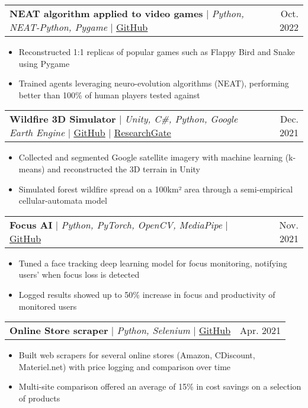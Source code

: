 \documentclass[letterpaper,11t]{article}
\makeatletter
\newcommand{\resumeItem}[1]{
  \item\small{
    {#1 \vspace{-2pt}}
  }
}
\newcommand{\resumeProjectHeading}[2]{
    \item
    \begin{tabular*}{0.97\textwidth}{l@{\extracolsep{\fill}}r}
      \small#1 & #2 \\
    \end{tabular*}\vspace{-7pt}
}
\newcommand{\resumeItemListStart}{\begin{itemize}}
\newcommand{\resumeItemListEnd}{\end{itemize}\vspace{-5pt}}
\makeatother
\begin{document}
          
        \resumeProjectHeading
        {\textbf{NEAT algorithm applied to video games} $|$ \emph{Python, NEAT-Python, Pygame} $|$ \href{https://github.com/Somnef/snake_neat_ai}{\underline{GitHub}}}{Oct. 2022}
            \resumeItemListStart
                \resumeItem{Reconstructed 1:1 replicas of popular games such as Flappy Bird and Snake using Pygame}
                \resumeItem{Trained agents leveraging neuro-evolution algorithms (NEAT), performing better than 100\% of human players tested against}
            \resumeItemListEnd

        \resumeProjectHeading
            {\textbf{Wildfire 3D Simulator} $|$ \emph{Unity, C\#, Python, Google Earth Engine} $|$ \href{https://github.com/Somnef/semi-empirical-wildfire-simulation}{\underline{GitHub}} $|$ \href{https://www.researchgate.net/publication/354678516_Applying_semi-empirical_simulation_of_wildfire_on_real_world_satellite_imagery_data}{\underline{ResearchGate}}}{Dec. 2021}
                \resumeItemListStart
                    \resumeItem{Collected and segmented Google satellite imagery with machine learning (k-means) and reconstructed the 3D terrain in Unity}
                    \resumeItem{Simulated forest wildfire spread on a 100km² area through a semi-empirical cellular-automata model}
                \resumeItemListEnd

        \resumeProjectHeading
          {\textbf{Focus AI} $|$ \emph{Python, PyTorch, OpenCV, MediaPipe} $|$ \href{https://github.com/Somnef/focus-monitor-ai}{\underline{GitHub}}}{Nov. 2021}
          \resumeItemListStart
            \resumeItem{Tuned a face tracking deep learning model for focus monitoring, notifying users' when focus loss is detected }
            \resumeItem{Logged results showed up to 50\% increase in focus and productivity of monitored users} 
          \resumeItemListEnd

        \resumeProjectHeading
        {\textbf{Online Store scraper} $|$ \emph{Python, Selenium} $|$ \href{https://github.com/Somnef/Cdiscountscraper}{\underline{GitHub}}}{Apr. 2021}
            \resumeItemListStart
                \resumeItem{Built web scrapers for several online stores (Amazon, CDiscount, Materiel.net) with price logging and comparison over time}
                \resumeItem{Multi-site comparison offered an average of 15\% in cost savings on a selection of products}
            \resumeItemListEnd
      
\end{document}
